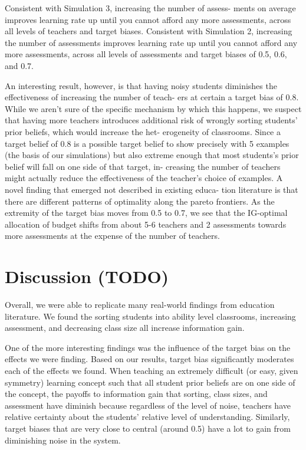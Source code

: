 \documentclass[10pt, letterpaper]{article}
\begin{document}
Consistent with Simulation 3, increasing the number of assess- ments on
average improves learning rate up until you cannot afford any more
assessments, across all levels of teachers and target biases. Consistent
with Simulation 2, increasing the number of assessments improves
learning rate up until you cannot afford any more assessments, across
all levels of assessments and target biases of 0.5, 0.6, and 0.7.

An interesting result, however, is that having noisy students diminishes
the effectiveness of increasing the number of teach- ers at certain a
target bias of 0.8. While we aren't sure of the specific mechanism by
which this happens, we suspect that having more teachers introduces
additional risk of wrongly sorting students' prior beliefs, which would
increase the het- erogeneity of classrooms. Since a target belief of 0.8
is a possible target belief to show precisely with 5 examples (the basis
of our simulations) but also extreme enough that most students's prior
belief will fall on one side of that target, in- creasing the number of
teachers might actually reduce the effectiveness of the teacher's choice
of examples. A novel finding that emerged not described in existing
educa- tion literature is that there are different patterns of
optimality along the pareto frontiers. As the extremity of the target
bias moves from 0.5 to 0.7, we see that the IG-optimal allocation of
budget shifts from about 5-6 teachers and 2 assessments towards more
assessments at the expense of the number of teachers.

\section{Discussion (TODO)}\label{discussion-todo}

Overall, we were able to replicate many real-world findings from
education literature. We found the sorting students into ability level
classrooms, increasing assessment, and decreasing class size all
increase information gain.

One of the more interesting findings was the influence of the target
bias on the effects we were finding. Based on our results, target bias
significantly moderates each of the effects we found. When teaching an
extremely difficult (or easy, given symmetry) learning concept such that
all student prior beliefs are on one side of the concept, the payoffs to
information gain that sorting, class sizes, and assessment have diminish
because regardless of the level of noise, teachers have relative
certainty about the students' relative level of understanding.
Similarly, target biases that are very close to central (around 0.5)
have a lot to gain from diminishing noise in the system.
\end{document}
